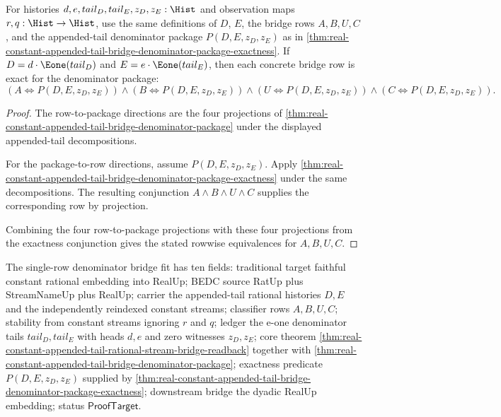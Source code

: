 \begin{theorem}
\label{thm:real-constant-appended-tail-bridge-single-row-denominator-package-exactness}
For histories $d,e,tail_D,tail_E,z_D,z_E:\Hist$ and observation maps
$r,q:\Hist\to\Hist$, use the same definitions of $D$, $E$, the bridge rows
$A,B,U,C$, and the appended-tail denominator package
$P(D,E,z_D,z_E)$ as in
\autoref{thm:real-constant-appended-tail-bridge-denominator-package-exactness}.
If $D=d\cdot\Eone(tail_D)$ and $E=e\cdot\Eone(tail_E)$, then each concrete
bridge row is exact for the denominator package:
$$
(A\Longleftrightarrow P(D,E,z_D,z_E))\land
(B\Longleftrightarrow P(D,E,z_D,z_E))\land
(U\Longleftrightarrow P(D,E,z_D,z_E))\land
(C\Longleftrightarrow P(D,E,z_D,z_E)).
$$
\end{theorem}
\begin{proof}
The row-to-package directions are the four projections of
\autoref{thm:real-constant-appended-tail-bridge-denominator-package} under the
displayed appended-tail decompositions.

For the package-to-row directions, assume $P(D,E,z_D,z_E)$. Apply
\autoref{thm:real-constant-appended-tail-bridge-denominator-package-exactness}
under the same decompositions. The resulting conjunction
$A\land B\land U\land C$ supplies the corresponding row by projection.

Combining the four row-to-package projections with these four projections from
the exactness conjunction gives the stated rowwise equivalences for
$A,B,U,C$.
\end{proof}

The single-row denominator bridge fit has ten fields: traditional target
faithful constant rational embedding into RealUp; BEDC source RatUp plus
StreamNameUp plus RealUp; carrier the appended-tail rational histories $D,E$
and the independently reindexed constant streams; classifier rows $A,B,U,C$;
stability from constant streams ignoring $r$ and $q$; ledger the e-one
denominator tails $tail_D,tail_E$ with heads $d,e$ and zero witnesses
$z_D,z_E$; core theorem
\autoref{thm:real-constant-appended-tail-rational-stream-bridge-readback}
together with
\autoref{thm:real-constant-appended-tail-bridge-denominator-package};
exactness predicate $P(D,E,z_D,z_E)$ supplied by
\autoref{thm:real-constant-appended-tail-bridge-denominator-package-exactness};
downstream bridge the dyadic RealUp embedding; status $\mathsf{ProofTarget}$.
